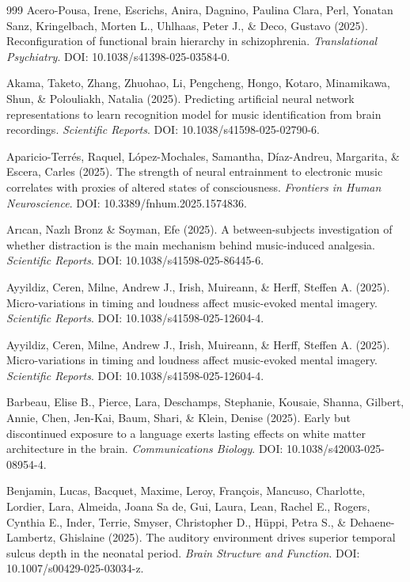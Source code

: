\documentclass[9pt,onecolumn]{article}
\begin{document}
\begin{thebibliography}{999}
Acero-Pousa, Irene, Escrichs, Anira, Dagnino, Paulina Clara, Perl, Yonatan Sanz, Kringelbach, Morten L., Uhlhaas, Peter J., \& Deco, Gustavo (2025). Reconfiguration of functional brain hierarchy in schizophrenia. \textit{Translational Psychiatry}. DOI: 10.1038/s41398-025-03584-0.

Akama, Taketo, Zhang, Zhuohao, Li, Pengcheng, Hongo, Kotaro, Minamikawa, Shun, \& Polouliakh, Natalia (2025). Predicting artificial neural network representations to learn recognition model for music identification from brain recordings. \textit{Scientific Reports}. DOI: 10.1038/s41598-025-02790-6.

Aparicio-Terrés, Raquel, López-Mochales, Samantha, Díaz-Andreu, Margarita, \& Escera, Carles (2025). The strength of neural entrainment to electronic music correlates with proxies of altered states of consciousness. \textit{Frontiers in Human Neuroscience}. DOI: 10.3389/fnhum.2025.1574836.

Arıcan, Nazlı Bronz \& Soyman, Efe (2025). A between-subjects investigation of whether distraction is the main mechanism behind music-induced analgesia. \textit{Scientific Reports}. DOI: 10.1038/s41598-025-86445-6.

Ayyildiz, Ceren, Milne, Andrew J., Irish, Muireann, \& Herff, Steffen A. (2025). Micro-variations in timing and loudness affect music-evoked mental imagery. \textit{Scientific Reports}. DOI: 10.1038/s41598-025-12604-4.

Ayyildiz, Ceren, Milne, Andrew J., Irish, Muireann, \& Herff, Steffen A. (2025). Micro-variations in timing and loudness affect music-evoked mental imagery. \textit{Scientific Reports}. DOI: 10.1038/s41598-025-12604-4.

Barbeau, Elise B., Pierce, Lara, Deschamps, Stephanie, Kousaie, Shanna, Gilbert, Annie, Chen, Jen-Kai, Baum, Shari, \& Klein, Denise (2025). Early but discontinued exposure to a language exerts lasting effects on white matter architecture in the brain. \textit{Communications Biology}. DOI: 10.1038/s42003-025-08954-4.

Benjamin, Lucas, Bacquet, Maxime, Leroy, François, Mancuso, Charlotte, Lordier, Lara, Almeida, Joana Sa de, Gui, Laura, Lean, Rachel E., Rogers, Cynthia E., Inder, Terrie, Smyser, Christopher D., Hüppi, Petra S., \& Dehaene-Lambertz, Ghislaine (2025). The auditory environment drives superior temporal sulcus depth in the neonatal period. \textit{Brain Structure and Function}. DOI: 10.1007/s00429-025-03034-z.


\end{thebibliography}
\end{document}
